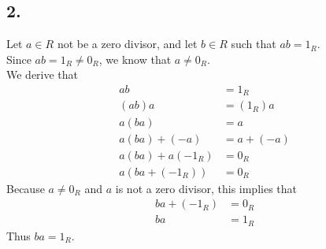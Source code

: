 \documentclass[11pt, a4paper]{article}
\begin{document}
\subsection*{2.}
Let $a \in R$ not be a zero divisor, and let $b \in R$ such that $ab=1_R$.\\
Since $ab = 1_R \neq 0_R$, we know that $a \neq 0_R$. \\
We derive that
\begin{align*}
    ab &= 1_R\\
    (ab)a &= (1_R)a\\
    a(ba) &= a\\
    a(ba)+(-a) &= a + (-a)\\
    a(ba)+a(-1_R) &= 0_R\\
    a(ba+(-1_R)) &= 0_R
\end{align*}
Because $a \neq 0_R$ and $a$ is not a zero divisor, this implies that
\begin{align*}
    ba+(-1_R) &= 0_R \\
    ba &= 1_R
\end{align*}
Thus $ba=1_R.$
\end{document}
